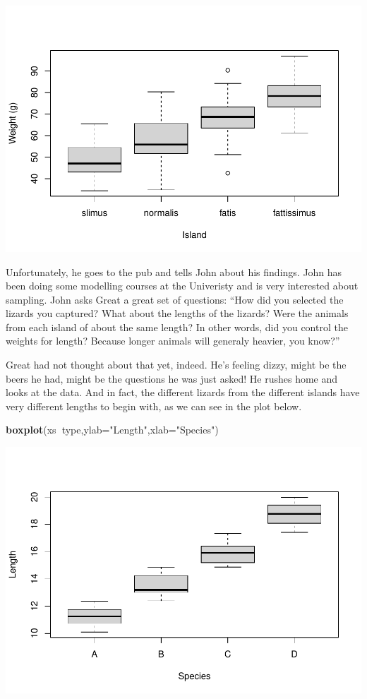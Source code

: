 \documentclass[
]{book}
\newenvironment{Shaded}{\begin{snugshade}}{\end{snugshade}}
\newcommand{\DataTypeTok}[1]{\textcolor[rgb]{0.13,0.29,0.53}{#1}}
\newcommand{\KeywordTok}[1]{\textcolor[rgb]{0.13,0.29,0.53}{\textbf{#1}}}
\newcommand{\NormalTok}[1]{#1}
\newcommand{\OperatorTok}[1]{\textcolor[rgb]{0.81,0.36,0.00}{\textbf{#1}}}
\newcommand{\StringTok}[1]{\textcolor[rgb]{0.31,0.60,0.02}{#1}}
\begin{document}
\includegraphics{ECOMODbook_files/figure-latex/a10.5-1.pdf}

Unfortunately, he goes to the pub and tells John about his findings. John has been doing some modelling courses at the Univeristy and is very interested about sampling.
John asks Great a great set of questions: ``How did you selected the lizards you captured? What about the lengths of the lizards? Were the animals from each island of about the same length? In other words, did you control the weights for length? Because longer animals will generaly heavier, you know?''

Great had not thought about that yet, indeed. He's feeling dizzy, might be the beers he had, might be the questions he was just asked! He rushes home and looks at the data. And in fact, the different lizards from the different islands have very different lengths to begin with, as we can see in the plot below.

\begin{Shaded}
\begin{Highlighting}[]
\KeywordTok{boxplot}\NormalTok{(xs}\OperatorTok{~}\NormalTok{type,}\DataTypeTok{ylab=}\StringTok{"Length"}\NormalTok{,}\DataTypeTok{xlab=}\StringTok{"Species"}\NormalTok{)}
\end{Highlighting}
\end{Shaded}

\includegraphics{ECOMODbook_files/figure-latex/a10.6-1.pdf}
\end{document}
